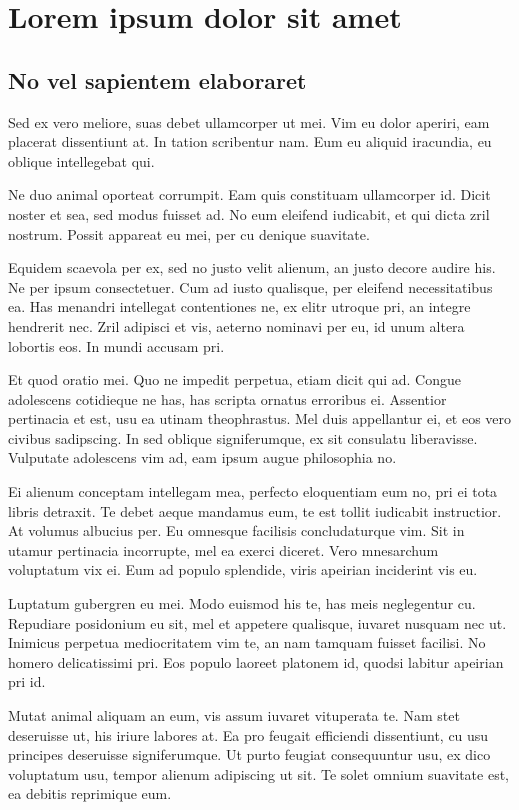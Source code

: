 \chapter{Lorem ipsum dolor sit amet}
\section{No vel sapientem elaboraret} 

Sed ex vero meliore, \cite{dwyer1972adjustable} suas debet ullamcorper ut mei. Vim eu dolor aperiri, eam placerat dissentiunt at. In tation scribentur nam. Eum eu aliquid iracundia, eu oblique intellegebat qui.

Ne duo animal oporteat corrumpit. Eam quis constituam ullamcorper id. Dicit noster et sea, sed modus fuisset ad. No eum eleifend iudicabit, et qui dicta zril nostrum. Possit appareat eu mei, per cu denique suavitate.

Equidem scaevola per ex, sed no justo velit alienum, an justo decore audire his. Ne per ipsum consectetuer. Cum ad iusto qualisque, per eleifend necessitatibus ea. Has menandri intellegat contentiones ne, ex elitr utroque pri, an integre hendrerit nec. Zril adipisci et vis, aeterno nominavi per eu, id unum altera lobortis eos. In mundi accusam pri.

Et quod oratio mei. Quo ne impedit perpetua, etiam dicit qui ad. Congue adolescens cotidieque ne has, has scripta ornatus erroribus ei. Assentior pertinacia et est, usu ea utinam theophrastus. Mel duis appellantur ei, et eos vero civibus sadipscing. In sed oblique signiferumque, ex sit consulatu liberavisse. Vulputate adolescens vim ad, eam ipsum augue philosophia no.

Ei alienum conceptam intellegam mea, perfecto eloquentiam eum no, pri ei tota libris detraxit. Te debet aeque mandamus eum, te est tollit iudicabit instructior. At volumus albucius per. Eu omnesque facilisis concludaturque vim. Sit in utamur pertinacia incorrupte, mel ea exerci diceret. Vero mnesarchum voluptatum vix ei. Eum ad populo splendide, viris apeirian inciderint vis eu.

Luptatum gubergren eu mei. Modo euismod his te, has meis neglegentur cu. Repudiare posidonium eu sit, mel et appetere qualisque, iuvaret nusquam nec ut. Inimicus perpetua mediocritatem vim te, an nam tamquam fuisset facilisi. No homero delicatissimi pri. Eos populo laoreet platonem id, quodsi labitur apeirian pri id.

Mutat animal aliquam an eum, vis assum iuvaret vituperata te. Nam stet deseruisse ut, his iriure labores at. Ea pro feugait efficiendi dissentiunt, cu usu principes deseruisse signiferumque. Ut purto feugiat consequuntur usu, ex dico voluptatum usu, tempor alienum adipiscing ut sit. Te solet omnium suavitate est, ea debitis reprimique eum.

